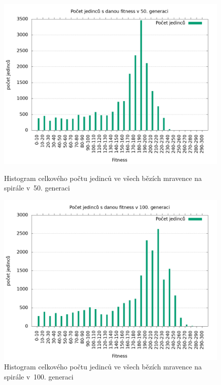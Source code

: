 \begin{figure}[h]
    \begin{minipage}[c]{0.48\linewidth}
        \includegraphics[width=\linewidth]{obrazky/mravenec_spirala_fitnessHistogram50.png}
        \caption{Histogram celkového počtu jedinců ve všech bězích mravence na spirále v~50. generaci}
        \label{fig:mravenec_spirala_histogram_50}
    \end{minipage}
    \hfill
    \begin{minipage}[c]{0.48\linewidth}
        \includegraphics[width=\linewidth]{obrazky/mravenec_spirala_fitnessHistogram100.png}
        \caption{Histogram celkového počtu jedinců ve všech bězích mravence na spirále v~100. generaci}
        \label{fig:mravenec_spirala_histogram_100}
    \end{minipage}
\end{figure}

